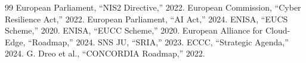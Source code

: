 \documentclass[12pt,a4paper]{report}
\begin{document}
\begin{thebibliography}{99}
 European Parliament, ``NIS2 Directive,'' 2022.
 European Commission, ``Cyber Resilience Act,'' 2022.
 European Parliament, ``AI Act,'' 2024.
 ENISA, ``EUCS Scheme,'' 2020.
 ENISA, ``EUCC Scheme,'' 2020.
 European Alliance for Cloud-Edge, ``Roadmap,'' 2024.
 SNS JU, ``SRIA,'' 2023.
 ECCC, ``Strategic Agenda,'' 2024.
 G. Dreo et al., ``CONCORDIA Roadmap,'' 2022.
\end{thebibliography}
\end{document}
